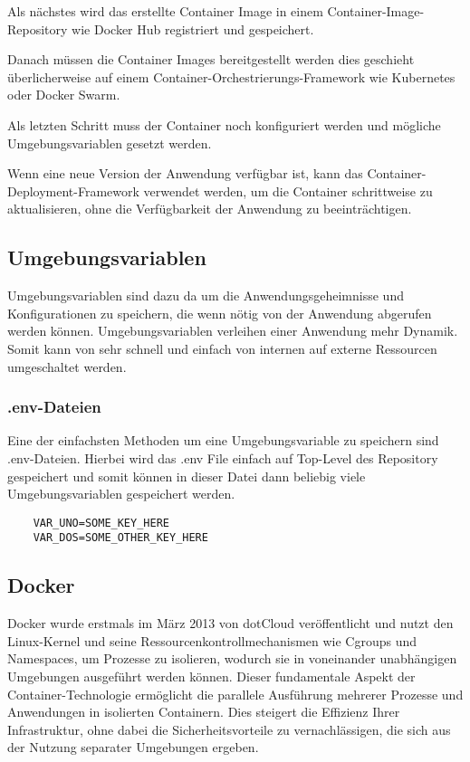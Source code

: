 Als nächstes wird das erstellte Container Image in einem Container-Image-Repository wie Docker Hub registriert und gespeichert.

Danach müssen die Container Images bereitgestellt werden dies geschieht überlicherweise auf einem Container-Orchestrierungs-Framework wie Kubernetes oder Docker Swarm.

Als letzten Schritt muss der Container noch konfiguriert werden und mögliche Umgebungsvariablen gesetzt werden.

Wenn eine neue Version der Anwendung verfügbar ist, kann das Container-Deployment-Framework verwendet werden, um die Container schrittweise zu aktualisieren, ohne die Verfügbarkeit der Anwendung zu beeinträchtigen.

\subsection{Umgebungsvariablen}

Umgebungsvariablen sind dazu da um die Anwendungsgeheimnisse und Konfigurationen zu speichern, die wenn nötig von der Anwendung abgerufen werden können. Umgebungsvariablen verleihen einer Anwendung mehr Dynamik. Somit kann von sehr schnell und einfach von internen auf externe Ressourcen umgeschaltet werden.

\subsubsection{.env-Dateien}

Eine der einfachsten Methoden um eine Umgebungsvariable zu speichern sind .env-Dateien. Hierbei wird das .env File einfach auf Top-Level des Repository gespeichert und somit können in dieser Datei dann beliebig viele Umgebungsvariablen gespeichert werden.

\begin{verbatim}
    VAR_UNO=SOME_KEY_HERE
    VAR_DOS=SOME_OTHER_KEY_HERE
\end{verbatim}

\cite{Umgebungsvariablen}



\subsection{Docker}

Docker wurde erstmals im März 2013 von dotCloud veröffentlicht und nutzt den Linux-Kernel und seine Ressourcenkontrollmechanismen wie Cgroups und Namespaces, um Prozesse zu isolieren, wodurch sie in voneinander unabhängigen Umgebungen ausgeführt werden können. Dieser fundamentale Aspekt der Container-Technologie ermöglicht die parallele Ausführung mehrerer Prozesse und Anwendungen in isolierten Containern. Dies steigert die Effizienz Ihrer Infrastruktur, ohne dabei die Sicherheitsvorteile zu vernachlässigen, die sich aus der Nutzung separater Umgebungen ergeben.

